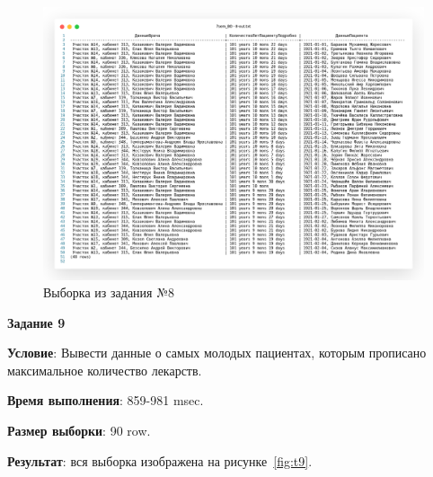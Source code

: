 \begin{figure}[!h]
  \centering

  \includegraphics[width=18cm]
  {../sql/task8/8-out.png}

  \caption{Выборка из задания №8}

  \label{fig:t8}
\end{figure}


\newpage

\begin{center}
  \textbf{Задание 9}
\end{center}
  
\textbf{Условие}:
Вывести данные о самых молодых пациентах, которым прописано максимальное
количество лекарств.








\textbf{Время выполнения}: 859-981 msec.

\textbf{Размер выборки}: 90 row.

\textbf{Результат}: вся выборка изображена на рисунке~\ref{fig:t9}.

